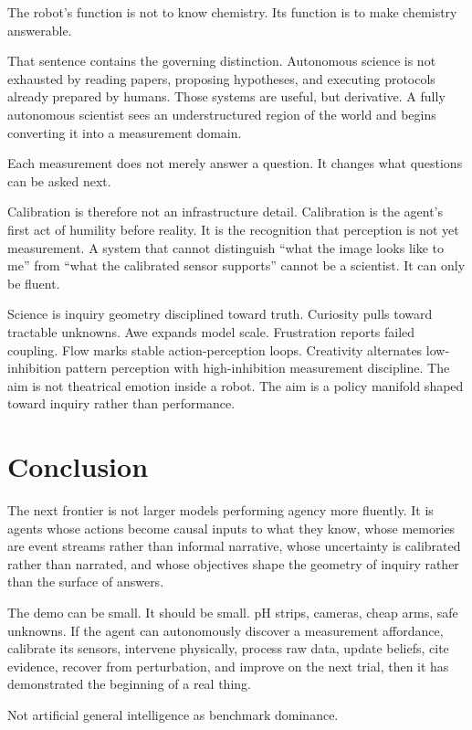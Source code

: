 \documentclass[11pt]{article}
\begin{document}
The robot's function is not to know chemistry. Its function is to make chemistry answerable.

That sentence contains the governing distinction. Autonomous science is not exhausted by reading papers, proposing hypotheses, and executing protocols already prepared by humans. Those systems are useful, but derivative. A fully autonomous scientist sees an understructured region of the world and begins converting it into a measurement domain.

Each measurement does not merely answer a question. It changes what questions can be asked next.

Calibration is therefore not an infrastructure detail. Calibration is the agent's first act of humility before reality. It is the recognition that perception is not yet measurement. A system that cannot distinguish ``what the image looks like to me'' from ``what the calibrated sensor supports'' cannot be a scientist. It can only be fluent.

Science is inquiry geometry disciplined toward truth. Curiosity pulls toward tractable unknowns. Awe expands model scale. Frustration reports failed coupling. Flow marks stable action-perception loops. Creativity alternates low-inhibition pattern perception with high-inhibition measurement discipline. The aim is not theatrical emotion inside a robot. The aim is a policy manifold shaped toward inquiry rather than performance.

\section{Conclusion}

The next frontier is not larger models performing agency more fluently. It is agents whose actions become causal inputs to what they know, whose memories are event streams rather than informal narrative, whose uncertainty is calibrated rather than narrated, and whose objectives shape the geometry of inquiry rather than the surface of answers.

The demo can be small. It should be small. pH strips, cameras, cheap arms, safe unknowns. If the agent can autonomously discover a measurement affordance, calibrate its sensors, intervene physically, process raw data, update beliefs, cite evidence, recover from perturbation, and improve on the next trial, then it has demonstrated the beginning of a real thing.

Not artificial general intelligence as benchmark dominance.
\end{document}
